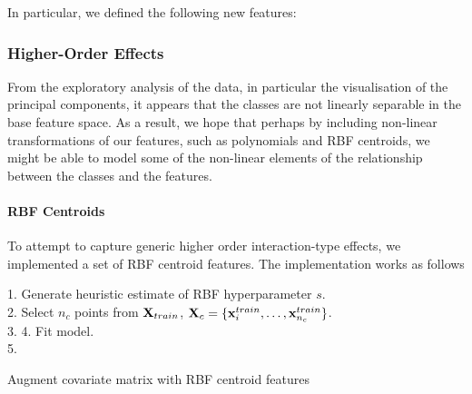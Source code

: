 In particular, we defined the following new features:

\subsubsection{Higher-Order Effects}
From the exploratory analysis of the data, in particular the visualisation of the principal components, it appears that the classes are not linearly separable in the base feature space. As a result, we hope that perhaps by including non-linear transformations of our features, such as polynomials and RBF centroids, we might be able to model some of the non-linear elements of the relationship between the classes and the features.

\paragraph{RBF Centroids}
To attempt to capture generic higher order interaction-type effects, we implemented a set of RBF centroid features. The implementation works as follows \newline
\begin{algorithm}[H]
    1. Generate heuristic estimate of RBF hyperparameter $s$.\\
    2. Select $n_c$ points from $\mathbf{X}_{train}$, $\mathbf{X}_c = \{\mathbf{x}^{train}_i, \dots, \mathbf{x}^{train}_{n_c}\}$.\\
    3.  
    4. Fit model.\\
    5. 
    \caption{Augment covariate matrix with RBF centroid features}
\end{algorithm}

